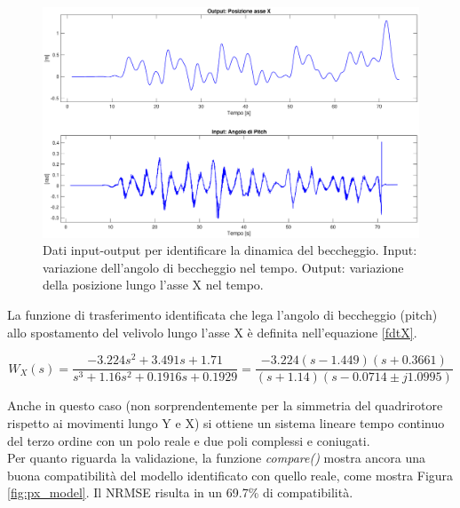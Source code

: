 \begin{figure}[H]
	\centering
	\includegraphics[width=1\textwidth]{gfx/SysId/pxinput}
	\caption[Dati input-output per identificare la dinamica del beccheggio.]{Dati input-output per identificare la dinamica del beccheggio. Input: variazione dell'angolo di beccheggio nel tempo. Output: variazione della posizione lungo l'asse X nel tempo.}
	\label{fig:px_input}
\end{figure}

La funzione di trasferimento identificata che lega l'angolo di beccheggio (pitch) allo spostamento del velivolo lungo l'asse X è definita nell'equazione \ref{fdtX}.

\begin{equation}
	W_X(s) = \frac{-3.224s^2 + 3.491s + 1.71}{s^3 + 1.16s^2 + 0.1916s + 0.1929}
	= \frac{-3.224(s-1.449)(s+0.3661)}{(s+1.14)(s-0.0714\pm j1.0995)}
	\label{fdtX}
\end{equation}

Anche in questo caso (non sorprendentemente per la simmetria del quadrirotore rispetto ai movimenti lungo Y e X) si ottiene un sistema lineare tempo continuo del terzo ordine con un polo reale e due poli complessi e coniugati.\\

Per quanto riguarda la validazione, la funzione \emph{compare()} \cite{compare} mostra ancora una buona compatibilità del modello identificato con quello reale, come mostra Figura \ref{fig:px_model}. Il \acs{NRMSE} risulta in un 69.7\% di compatibilità.

